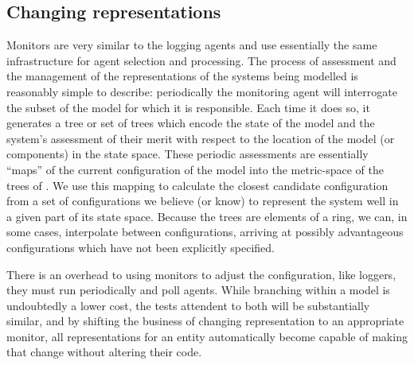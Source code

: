 \subsection{Changing representations}

Monitors are very similar to the logging agents and use essentially
the same infrastructure for agent selection and processing.  The
process of assessment and the management of the representations of the
systems being modelled is reasonably simple to describe: periodically
the monitoring agent will interrogate the subset of the model for
which it is responsible. Each time it does so, it generates a tree or
set of trees which encode the state of the model and the system's
assessment of their merit with respect to the location of the model
(or components) in the state space.  These periodic assessments are
essentially ``maps'' of the current configuration of the model into
the metric-space of the trees of \Cfour.  We use this mapping to
calculate the closest candidate configuration from a set of
configurations we believe (or know) to represent the system well in a
given part of its state space. Because the trees are elements of a
ring, we can, in some cases, interpolate between configurations,
arriving at possibly advantageous configurations which have not been
explicitly specified.

There is an overhead to using monitors to adjust the configuration,
like loggers, they must run periodically and poll agents. While
branching within a model is undoubtedly a lower cost, the tests
attendent to both will be substantially similar, and by shifting the
business of changing representation to an appropriate monitor, all
representations for an entity automatically become capable of making
that change without altering their code. 

